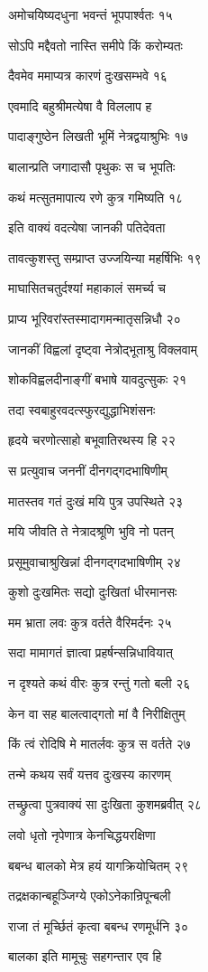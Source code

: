 अमोचयिष्यदधुना भवन्तं भूपपार्श्वतः १५

सोऽपि मद्दैवतो नास्ति समीपे किं करोम्यतः

दैवमेव ममाप्यत्र कारणं दुःखसम्भवे १६

एवमादि बहुश्रीमत्येषा वै विललाप ह

पादाङ्गुष्ठेन लिखती भूमिं नेत्रद्वयाश्रुभिः १७

बालान्प्रति जगादासौ पृथुकः स च भूपतिः

कथं मत्सुतमापात्य रणे कुत्र गमिष्यति १८

इति वाक्यं वदत्येषा जानकी पतिदेवता

तावत्कुशस्तु सम्प्राप्त उज्जयिन्या महर्षिभिः १९

माघासितचतुर्दश्यां महाकालं समर्च्य च

प्राप्य भूरिवरांस्तस्मादागमन्मातृसन्निधौ २०

जानकीं विह्वलां दृष्ट्वा नेत्रोद्भूताश्रु विक्लवाम्

शोकविह्वलदीनाङ्गीं बभाषे यावदुत्सुकः २१

तदा स्वबाहुरवदत्स्फुरद्युद्धाभिशंसनः

हृदये चरणोत्साहो बभूवातिरथस्य हि २२

स प्रत्युवाच जननीं दीनगद्गदभाषिणीम्

मातस्तव गतं दुःखं मयि पुत्र उपस्थिते २३

मयि जीवति ते नेत्रादश्रूणि भुवि नो पतन्

प्रसूमुवाचाश्रुखिन्नां दीनगद्गदभाषिणीम् २४

कुशो दुःखमितः सद्यो दुःखितां धीरमानसः

मम भ्राता लवः कुत्र वर्तते वैरिमर्दनः २५

सदा मामागतं ज्ञात्वा प्रहर्षन्सन्निधावियात्

न दृश्यते कथं वीरः कुत्र रन्तुं गतो बली २६

केन वा सह बालत्वाद्गतो मां वै निरीक्षितुम्

किं त्वं रोदिषि मे मातर्लवः कुत्र स वर्तते २७

तन्मे कथय सर्वं यत्तव दुःखस्य कारणम्

तच्छ्रुत्वा पुत्रवाक्यं सा दुःखिता कुशमब्रवीत् २८

लवो धृतो नृपेणात्र केनचिद्धयरक्षिणा

बबन्ध बालको मेत्र हयं यागक्रियोचितम् २९

तद्रक्षकान्बहूञ्जिग्ये एकोऽनेकान्रिपून्बली

राजा तं मूर्च्छितं कृत्वा बबन्ध रणमूर्धनि ३०

बालका इति मामूचुः सहगन्तार एव हि

